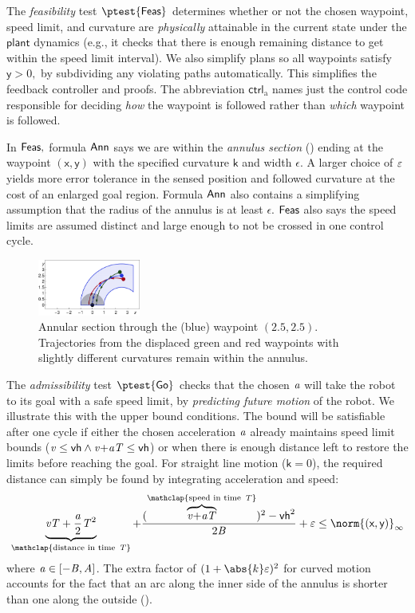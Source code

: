 \documentclass[12pt]{cmuthesis}
\theoremstyle{definition}
\theoremstyle{remark}
\newcommand{\xgvar}{\textsf{x}}
\newcommand{\ygvar}{\textsf{y}}
\newcommand{\kvar}{\textsf{k}}
\newcommand{\vhvar}{\textsf{vh}}
\newcommand{\ctrl}{\textsf{ctrl}\xspace}
\newcommand{\ctrlliv}{\ctrl_{\text{a}}}
\newcommand{\plant}{\textsf{plant}\xspace}
\newcommand{\lnorm}[1]{{{\norm{#1}}_{\infty}}}
\newcommand{\rref}[2][]{\prettyref{#2}}
\begin{document}
The \emph{feasibility} test $\ptest{\planreq}$ determines whether or not the chosen waypoint, speed limit, and curvature are \emph{physically} attainable in the current state under the $\plant$ dynamics (e.g., it checks that there is enough remaining distance to get within the speed limit interval).
We also simplify plans so all waypoints satisfy $\ygvar > 0,$ by subdividing any violating paths automatically.
This simplifies the feedback controller and proofs.
The abbreviation $\ctrlliv$ names just the control code responsible for deciding \emph{how} the waypoint is followed rather than \emph{which} waypoint is followed.


In $\textsf{Feas},$ formula $\textsf{Ann}$ says we are within the \emph{annulus section} (\rref{fig:circlestaging}) ending at the waypoint $(\xgvar, \ygvar)$ with the specified curvature $\kvar$ and width $\epsilon$.
A larger choice of $\varepsilon$ yields more error tolerance in the sensed position and followed curvature at the cost of an enlarged goal region.
Formula $\textsf{Ann}$ also contains a simplifying assumption that the radius of the annulus is at least $\epsilon$.
$\textsf{Feas}$ also says the speed limits are assumed distinct and large enough to not be crossed in one control cycle.

\begin{figure}[h!]
\centering
\includegraphics[width=0.3\textwidth]{graphics/fig-ode3.pdf}
\caption{Annular section through the (blue) waypoint $(2.5,2.5)$. Trajectories from the displaced green and red waypoints with slightly different curvatures remain within the annulus.}\label{fig:circlestaging}
\label{fig:circlestaging}
\end{figure}

The \emph{admissibility} test $\ptest{\admiss}$ checks that the chosen ${\it a}$ will take the robot to its goal with a safe speed limit, by \emph{predicting future motion} of the robot.
We illustrate this with the upper bound conditions.
The bound will be satisfiable after one cycle if either the chosen acceleration ${\it a}$ already maintains speed limit bounds ($\vvar \leq \vhvar \land \vvar{+}\avar\Tvar \leq \vhvar$) or when there is enough distance left to restore the limits before reaching the goal.
For straight line motion ($\kvar=0$), the required distance can simply be found by integrating acceleration and speed:
\begin{equation*}
\underbrace{\vvar\Tvar+\frac{\avar}{2}\Tvar^2}_{\mathclap{\text{distance in time}~\Tvar}} + \frac{(\overbrace{\vvar{+}\avar\Tvar}^{\mathclap{\text{speed in time}~\Tvar}})^2-\vhvar^2}{2\Bvar} + \veps \leq \lnorm{(\xgvar,\ygvar)}
\end{equation*}
where ${\it a} \in [-{\it B},{\it A}]$.
The extra factor of $(1 + \abs{k}\veps)^2$ for curved motion accounts for the fact that an arc along the inner side of the annulus is shorter than one along the outside (\rref{fig:circlestaging}).
\end{document}
